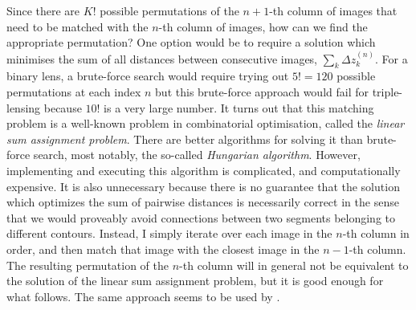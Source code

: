 \documentclass[12pt,dvipsnames]{report}
\begin{document}
Since there are $K!$ possible permutations of the $n+1$-th column of images that need to 
be matched with the $n$-th column of images, how can we find the appropriate permutation? 
One option  would be to require a solution which minimises the sum of all distances 
between consecutive images, $\sum_k \Delta z^{(n)}_k$.
For a binary lens, a brute-force search would require trying out $5!=120$ possible permutations 
at each index $n$ but this brute-force approach would fail for triple-lensing because 
$10!$ is a very large number. It turns out that this matching problem is a well-known problem 
in combinatorial optimisation, called the \emph{linear sum assignment problem}. There are better
algorithms for solving it than brute-force search, most notably, the so-called
\emph{Hungarian algorithm}. However, implementing and executing this algorithm is complicated, 
and computationally expensive. It is also unnecessary because there is no guarantee that 
the solution which optimizes the sum of pairwise distances is necessarily correct in the sense 
that we would proveably avoid connections between two segments belonging to different contours.
Instead, I simply iterate over each image in the $n$-th column in order, and then match that 
image with the closest image in  the $n-1$-th column.  The resulting permutation of the 
$n$-th column will in general not be equivalent to the solution 
of the linear sum assignment problem, but it is good enough for what follows.
The same approach seems to be used by \citet{2021MNRAS.503.6143K}.
\end{document}
